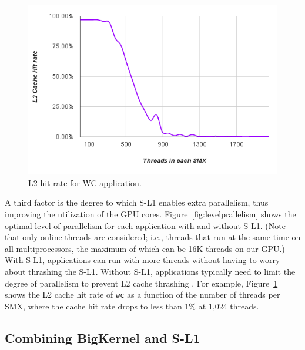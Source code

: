 \begin{figure}[t]
\includegraphics[scale=0.24]{10L2HitRateWC.png}
\caption{L2 hit rate for WC application.}
\label{fig:l2hitrate}
\end{figure}

A third factor is the degree to which S-L1 enables extra parallelism, thus improving the utilization of the GPU cores.
Figure~\ref{fig:levelprallelism} shows the optimal level of parallelism for each application with and without S-L1. 
(Note that only online threads are considered; i.e., threads that run at the same time on all multiprocessors, the maximum of which can be 16K threads on our GPU.)
With S-L1, applications can run with more threads without having to worry about thrashing the S-L1.
Without S-L1, applications typically need to limit the degree of parallelism to prevent L2 cache thrashing .
For example, Figure~\ref{fig:l2hitrate} shows the L2 cache hit rate of \texttt{wc} as a function of
the number of threads per SMX, where the cache hit rate drops to less than 1\% at 1,024 threads.







\subsection{Combining BigKernel and S-L1}

